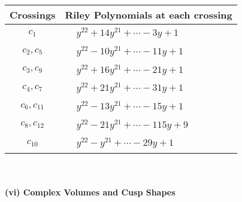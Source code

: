 \documentclass[1p]{elsarticle_modified}
\theoremstyle{definition}
\begin{document}
\begin{tabular}{m{50pt}|m{274pt}}
Crossings & \hspace{64pt}Riley Polynomials at each crossing \\
\hline $$\begin{aligned}c_{1}\end{aligned}$$&$\begin{aligned}
&y^{22}+14 y^{21}+\cdots-3 y+1
\end{aligned}$\\
\hline $$\begin{aligned}c_{2},c_{5}\end{aligned}$$&$\begin{aligned}
&y^{22}-10 y^{21}+\cdots-11 y+1
\end{aligned}$\\
\hline $$\begin{aligned}c_{3},c_{9}\end{aligned}$$&$\begin{aligned}
&y^{22}+16 y^{21}+\cdots-21 y+1
\end{aligned}$\\
\hline $$\begin{aligned}c_{4},c_{7}\end{aligned}$$&$\begin{aligned}
&y^{22}+21 y^{21}+\cdots-31 y+1
\end{aligned}$\\
\hline $$\begin{aligned}c_{6},c_{11}\end{aligned}$$&$\begin{aligned}
&y^{22}-13 y^{21}+\cdots-15 y+1
\end{aligned}$\\
\hline $$\begin{aligned}c_{8},c_{12}\end{aligned}$$&$\begin{aligned}
&y^{22}-21 y^{21}+\cdots-115 y+9
\end{aligned}$\\
\hline $$\begin{aligned}c_{10}\end{aligned}$$&$\begin{aligned}
&y^{22}- y^{21}+\cdots-29 y+1
\end{aligned}$\\
\hline
\end{tabular}\\~\\
\newpage\flushleft \textbf{(vi) Complex Volumes and Cusp Shapes}
\end{document}
